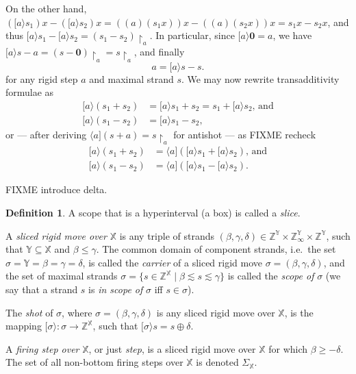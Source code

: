 \documentclass [a4paper,12pt] {article}
\theoremstyle{definition}
\newtheorem{definition}{Definition}[section]
\newcommand{\domain}{}
\DeclareRobustCommand{\domain}{\mathop{\textstyle\mathsmaller{\bf {Dom}}}}
\newcommand{\carrier}{}
\DeclareRobustCommand{\carrier}{\mathop{\textstyle\mathsmaller{\bf {Car}}}}
\newcommand{\scope}{}
\DeclareRobustCommand{\scope}{\mathop{\textstyle\mathsmaller{\bf {Sco}}}}
\newcommand{\move}{}
\DeclareRobustCommand{\move}{\mathop{\textstyle\mathsmaller{\bf {Mov}}}}
\newcommand{\shift}{}
\DeclareRobustCommand{\shift}{\mathop{\textstyle\mathsmaller{\bf {Shi}}}}
\begin{document}
On the other hand, $({[a\rangle}s_1)x - ({[a\rangle}s_2)x =
    ((\move{a})(s_1x))x - ((\move{a})(s_2x))x = s_1x - s_2x$, and thus
    ${[a\rangle}s_1 - {[a\rangle}s_2 = (s_1 -
        s_2){\restriction}_{\carrier{a}}$.  In particular, since
        ${[a\rangle}\bm{0} = \shift{a}$, we have ${[a\rangle}s -
            \shift{a} = (s - \bm{0}){\restriction}_{\carrier{a}} =
            s{\restriction}_{\carrier{a}}$, and finally
%
\[\shift{a} = {[a\rangle}s - s.\]
%
for any rigid step $a$ and maximal strand $s$.  We may now rewrite
transadditivity formulae as
%
\begin {align*}
  {[a\rangle}(s_1 + s_2) &= {[a\rangle}s_1 +
      s_2 = s_1 + {[a\rangle}s_2\textrm{, and}\\
  {[a\rangle}(s_1 - s_2) &= {[a\rangle}s_1 - s_2,
\end {align*}
%
or --- after deriving ${\langle a]}(s + \shift{a}) =
    s{\restriction}_{\carrier{a}}$ for antishot --- as FIXME recheck
%
\begin {align*}
  {[a\rangle}(s_1 + s_2) &= {\langle a]}({[a\rangle}s_1
    + {[a\rangle}s_2)\textrm{, and}\\
  {[a\rangle}(s_1 - s_2) &= {\langle a]}({[a\rangle}s_1
    - {[a\rangle}s_2).
\end {align*}

FIXME introduce delta.

\begin {definition}\label{def-step}
  A scope that is a hyperinterval (a box) is called a {\em slice}\/.

  A {\em sliced rigid move over}\/ ${\mathbb X}$ is any triple of
  strands $(\beta, \gamma, \delta) \in {\mathbb Z}^{\mathbb
    Y}\!\times\!{\mathbb Z}_\infty^{\mathbb Y}\!\times\!{\mathbb
    Z}^{\mathbb Y}$, such that ${\mathbb Y} \subseteq {\mathbb X}$ and
  $\beta \leq \gamma$.  The common domain of component strands,
  i.e.\ the set $\carrier{\sigma} = {\mathbb Y} = \domain{\beta} =
  \domain{\gamma} = \domain{\delta}$, is called the {\em carrier}\/ of
  a sliced rigid move $\sigma = (\beta, \gamma, \delta)$, and the set
  of maximal strands $\scope{\sigma} = \{s \in {\mathbb Z}^{\mathbb X}
  \;|\; \beta \apprle s \apprle \gamma\}$ is called the {\em scope
    of}\/ $\sigma$ (we say that a strand $s$ is {\em in scope of}\/
  $\sigma$ iff $s \in \scope{\sigma}$).

  The {\em shot}\/ of $\sigma$, where $\sigma = (\beta, \gamma,
  \delta)$ is any sliced rigid move over ${\mathbb X}$, is the mapping
  $[\sigma\rangle\!: \scope{\sigma} \rightarrow {\mathbb Z}^{\mathbb
      X}$, such that ${[\sigma\rangle}s = s \oplus \delta$.

  A {\em firing step over}\/ ${\mathbb X}$, or just {\em step}\/, is a
  sliced rigid move over ${\mathbb X}$ for which $\beta \geq -\delta$.
  The set of all non-bottom firing steps over ${\mathbb X}$ is denoted
  $\Sigma_{\mathbb X}$.
\end {definition}
\end{document}
